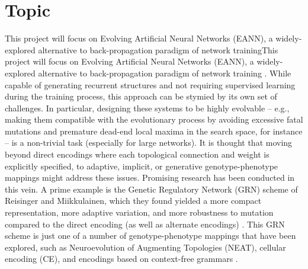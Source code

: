 \section{Topic}

 This project will focus on Evolving Artificial Neural Networks (EANN), a widely-explored alternative to back-propagation paradigm of network trainingThis project will focus on Evolving Artificial Neural Networks (EANN), a widely-explored alternative to back-propagation paradigm of network training \cite{Downing2015IntelligenceSystems}. While capable of generating recurrent structures and not requiring supervised learning during the training process, this approach can be stymied by its own set of challenges. In particular, designing these systems to be highly evolvable -- e.g., making them compatible with the evolutionary process by avoiding excessive fatal mutations and premature dead-end local maxima in the search space, for instance -- is a non-trivial task (especially for large networks). It is thought that moving beyond direct encodings where each topological connection and weight is explicitly specified, to adaptive, implicit, or generative genotype-phenotype mappings might address these issues. Promising research has been conducted in this vein. A prime example is the Genetic Regulatory Network (GRN) scheme of Reisinger and Miikkulainen, which they found yielded a more compact representation, more adaptive variation, and more robustness to mutation compared to the direct encoding (as well as alternate encodings) \cite{Reisinger2007AcquiringRepresentations}. This GRN scheme is just one of a number of genotype-phenotype mappings that have been explored, such as Neuroevolution of Augmenting Topologies (NEAT), cellular encoding (CE), and encodings based on context-free grammars \cite{Downing2015IntelligenceSystems}.